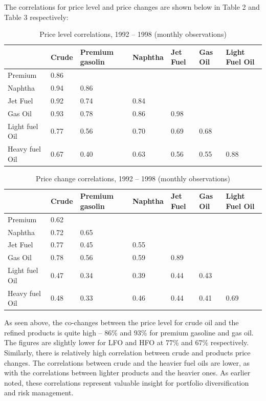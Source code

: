 \documentclass[a4paper,10pt]{article}
\begin{document}
\noindent The correlations for price level and price changes are shown below in Table 2 and Table 3 respectively:
\begin{table}[h!]
\begin{tabular}{|p{2.5cm}|p{1cm}|p{1.5cm}|p{1.5cm}|p{1cm}|p{1cm}|p{1cm}|}
    \hline
    & Crude & Premium gasolin & Naphtha & Jet Fuel & Gas Oil & Light Fuel Oil \\
    \hline
     Premium & 0.86 & & & & &\\
     Naphtha & 0.94 & 0.86 & & & &\\
     Jet Fuel & 0.92 & 0.74 & 0.84 & & &\\
     Gas Oil & 0.93 & 0.78 & 0.86 & 0.98 & &\\
     Light fuel Oil & 0.77 & 0.56 & 0.70 & 0.69 & 0.68 &\\
     Heavy fuel Oil & 0.67 & 0.40 & 0.63 & 0.56 & 0.55 & 0.88 \\
     \hline
\end{tabular}
\caption{Price level correlations, 1992 – 1998 (monthly observations)}
\label{table:2}
\end{table}

\begin{table}[h!]
\begin{tabular}{|p{2.5cm}|p{1cm}|p{1.5cm}|p{1.5cm}|p{1cm}|p{1cm}|p{1cm}|}
    \hline
    & Crude & Premium gasolin & Naphtha & Jet Fuel & Gas Oil & Light Fuel Oil \\
    \hline
     Premium & 0.62 & & & & &\\
     Naphtha & 0.72 & 0.65 & & & &\\
     Jet Fuel & 0.77 & 0.45 & 0.55 & & &\\
     Gas Oil & 0.78 & 0.56 & 0.59 & 0.89 & &\\
     Light fuel Oil & 0.47 & 0.34 & 0.39 & 0.44 & 0.43 &\\
     Heavy fuel Oil & 0.48 & 0.33 & 0.46 & 0.44 & 0.41 & 0.69 \\
     \hline
\end{tabular}
\caption{Price change correlations, 1992 – 1998 (monthly observations)}
\label{table:3}
\end{table}

As seen above, the co-changes between the price level for crude oil and the refined products is quite high – 86\% and 93\% for premium gasoline and gas oil. The figures are slightly lower for LFO and HFO at 77\% and 67\% respectively. Similarly, there is relatively high correlation between crude and products price changes. The correlations between crude and the heavier fuel oils are lower, as with the correlations between lighter products and the heavier ones. As earlier noted, these correlations represent valuable insight for portfolio diversification and risk management.
\end{document}

